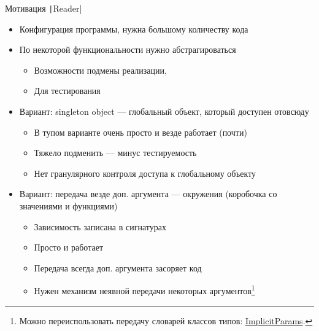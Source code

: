     \begin{frame}[fragile]{Мотивация \texttt|Reader|}
        \vspace{-0.5em}
        \begin{itemize}
            \item[\eg] Конфигурация программы, нужна большому количеству кода
            \item[\eg] По некоторой функциональности нужно абстрагироваться
            \begin{itemize}
                \item Возможности подмены реализации,
                \item[\eg] Для тестирования
            \end{itemize}
            \item Вариант: singleton object --- глобальный объект, который доступен отовсюду
            \begin{itemize}
                \item[\positive] В тупом варианте очень просто и везде работает (почти)
                \item[\negative] Тяжело подменить --- минус тестируемость
                \item[\negative] Нет гранулярного контроля доступа к глобальному объекту
            \end{itemize}
            \item Вариант: передача везде доп. аргумента --- окружения (коробочка со значениями и функциями)
            \begin{itemize}
                \item[\positive] Зависимость записана в сигнатурах
                \item[\positive] Просто и работает
                \item[\negative] Передача всегда доп. аргумента засоряет код
                \item[\then] Нужен механизм неявной передачи некоторых аргументов\footnote{Можно переиспользовать передачу словарей классов типов: \href{https://ghc.gitlab.haskell.org/ghc/doc/users_guide/exts/implicit_parameters.html}{\color{blue} ImplicitParams}.}
            \end{itemize}
        \end{itemize}
    \end{frame}

